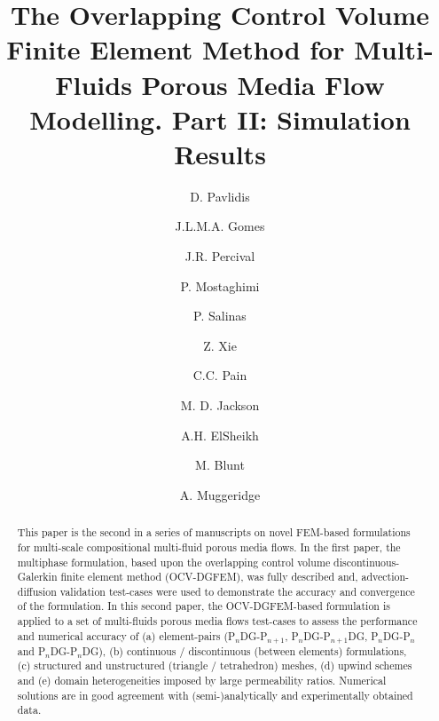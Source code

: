 \documentclass[preprint,authoryear,12pt]{elsarticle}
\newcommand{\PN}[2][error]{P$_{#1}$DG-P$_{#2}$}
\begin{document}
\begin{frontmatter}



\title{The Overlapping Control Volume Finite Element Method for Multi-Fluids Porous Media Flow Modelling. Part II: Simulation Results}

\author[IC]{D. Pavlidis} \author[UoA]{J.L.M.A. Gomes}  \author[IC]{J.R. Percival} \author[IC]{P. Mostaghimi} \author[IC]{P. Salinas} \author[IC]{Z. Xie} \author[IC]{C.C. Pain} \author[IC]{M. D. Jackson} \author[HW]{A.H. ElSheikh} \author[IC]{M. Blunt} \author[IC]{A. Muggeridge}  

\address[IC]{Applied Modelling and Computation Group, Department of Earth Science and Engineering, Imperial College London, UK}
\address[UoA]{Environmental $\&$ Industrial Fluids Mechanics Group, School of Engineering, University of Aberdeen, UK}
\address[HW]{Institute of Petroleum Engineering, Heriot-Watt University, Edinburgh, UK}


\begin{abstract} 
This paper is the second in a series of manuscripts on novel FEM-based formulations for multi-scale compositional multi-fluid porous media flows. In the first paper, the multiphase formulation, based upon the overlapping control volume discontinuous-Galerkin finite element method (OCV-DGFEM), was fully described and, advection-diffusion validation test-cases were used to demonstrate the accuracy and convergence of the formulation. In this second paper, the OCV-DGFEM-based formulation is applied to a set of multi-fluids porous media flows test-cases to assess the performance and numerical accuracy of (a) element-pairs (\PN[n]{n+1}, \PN[n]{n+1}DG, \PN[n]{n} and \PN[n]{n}DG), (b) continuous / discontinuous (between elements) formulations, (c) structured and unstructured (triangle / tetrahedron) meshes, (d) upwind schemes and (e) domain heterogeneities imposed by large permeability ratios. Numerical solutions are in good agreement with (semi-)analytically and experimentally obtained data.
\end{abstract}


\end{frontmatter}
\end{document}

